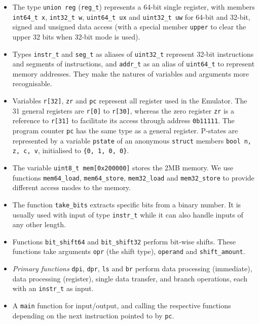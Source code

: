 \documentclass[11pt]{article}
\begin{document}
\begin{itemize}
    \item The type \texttt{union reg} (\texttt{reg\_t}) represents a 64-bit single register, with members \texttt{int64\_t x}, \texttt{int32\_t w}, \texttt{uint64\_t ux} and \texttt{uint32\_t uw} for 64-bit and 32-bit, signed and unsigned data access (with a special member \texttt{upper} to clear the upper 32 bits when 32-bit mode is used).

    \item Types \texttt{instr\_t} and \texttt{seg\_t} as aliases of \texttt{uint32\_t} represent 32-bit instructions and segments of instructions, and \texttt{addr\_t} as an alias of \texttt{uint64\_t} to represent memory addresses. They make the natures of variables and arguments more recognisable.
    
    \item Variables \texttt{r[32]}, \texttt{zr} and \texttt{pc} represent all register used in the Emulator. The 31 general registers are \texttt{r[0]} to \texttt{r[30]}, whereas the zero register \texttt{zr} is a reference to \texttt{r[31]} to facilitate its access through address \texttt{0b11111}. The program counter \texttt{pc} has the same type as a general register. P-states are represented by a variable \texttt{pstate} of an anonymous \texttt{struct} members \texttt{bool n, z, c, v}, initialised to \texttt{\{0, 1, 0, 0\}}.
    
    \item The variable \texttt{uint8\_t mem[0x200000]} stores the 2MB memory. We use functions \texttt{mem64\_load}, \texttt{mem64\_store}, \texttt{mem32\_load} and \texttt{mem32\_store} to provide different access modes to the memory.

    \item The function \texttt{take\_bits} extracts specific bits from a binary number. It is usually used with input of type \texttt{instr\_t} while it can also handle inputs of any other length.

    \item Functions \texttt{bit\_shift64} and \texttt{bit\_shift32} perform bit-wise shifts. These functions take arguments \texttt{opr} (the shift type), \texttt{operand} and \texttt{shift\_amount}.
    
    \item \textit{Primary functions} \texttt{dpi}, \texttt{dpr}, \texttt{ls} and \texttt{br} perform data processing (immediate), data processing (register), single data transfer, and branch operations, each with an \texttt{instr\_t} as input.

    \item A \texttt{main} function for input/output, and calling the respective functions depending on the next instruction pointed to by \texttt{pc}.
\end{itemize}
\end{document}
